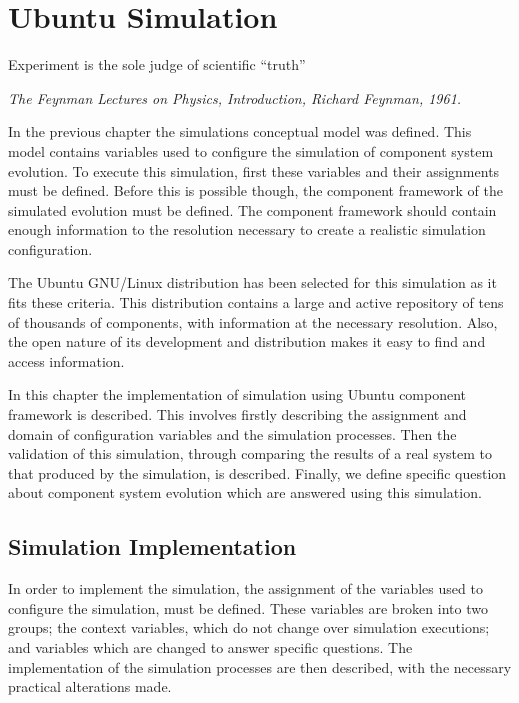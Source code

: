 
\chapter{Ubuntu Simulation}
\label{ubunutsimulation}
\epigraph{Experiment is the sole judge of scientific ``truth''}
{\textit{The Feynman Lectures on Physics, Introduction, Richard Feynman, 1961.}}

In the previous chapter the simulations conceptual model was defined.
This model contains variables used to configure the simulation of component system evolution.
To execute this simulation, first these variables and their assignments must be defined.
Before this is possible though, the component framework of the simulated evolution must be defined.
The component framework should contain enough information to the resolution necessary to create a realistic simulation configuration.

The Ubuntu GNU/Linux distribution has been selected for this simulation as it fits these criteria.
This distribution contains a large and active repository of tens of thousands of components, with information at the necessary resolution.
Also, the open nature of its development and distribution makes it easy to find and access information.

In this chapter the implementation of simulation using Ubuntu component framework is described.
This involves firstly describing the assignment and domain of configuration variables and the simulation processes.
Then the validation of this simulation, through comparing the results of a real system to that produced by the simulation, is described. 
Finally, we define specific question about component system evolution which are answered using this simulation.

\section{Simulation Implementation}
In order to implement the simulation, the assignment of the variables used to configure the simulation, must be defined.
These variables are broken into two groups; the context variables, which do not change over simulation executions; 
and variables which are changed to answer specific questions.
The implementation of the simulation processes are then described, with the necessary practical alterations made. 

